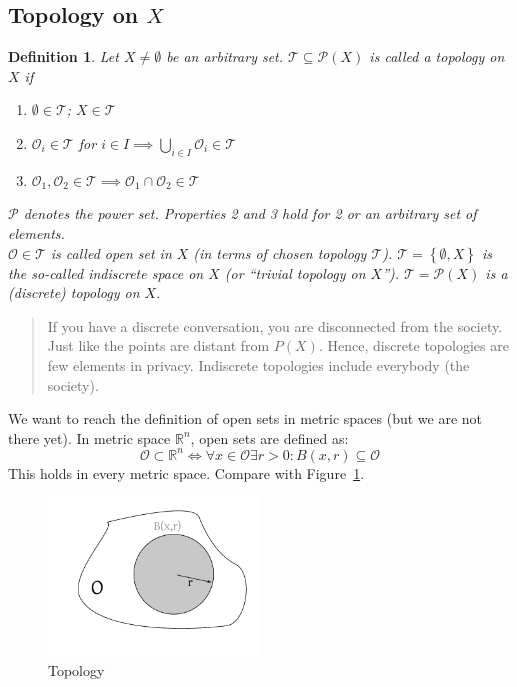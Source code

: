 \documentclass{article}
\newtheorem{definition}{Definition}  \numberwithin{definition}{section}
\newcommand{\set}[1]{\left\{#1\right\}}
\begin{document}
\subsection{Topology on $X$}

\begin{definition}
  Let $X \neq \emptyset$ be an arbitrary set.
  $\mathcal T \subseteq \mathcal P(X)$ is called a \emph{topology on $X$} if
  \begin{enumerate}
    \item $\emptyset \in \mathcal T$; $X \in \mathcal T$
    \item $\mathcal O_i \in \mathcal T$ for $i \in I \implies \bigcup_{i \in I} \mathcal O_i \in \mathcal T$
    \item $\mathcal O_1, \mathcal O_2 \in \mathcal T \implies \mathcal O_1 \cap \mathcal O_2 \in \mathcal T$
  \end{enumerate}
  $\mathcal P$ denotes the power set. Properties 2 and 3 hold for 2 or an arbitrary set of elements. \\
  $\mathcal O \in \mathcal T$ is called \emph{open set in $X$} (in terms of chosen topology $\mathcal T$).
  $\mathcal T = \set{\emptyset, X}$ is the so-called \emph{indiscrete space on $X$} (or \enquote{trivial topology on $X$}).
  $\mathcal T = \mathcal P(X)$ is a (discrete) topology on $X$.
\end{definition}

\begin{quote}
  If you have a discrete conversation, you are disconnected from the society.
  Just like the points are distant from $P(X)$.
  Hence, discrete topologies are few elements in privacy.
  Indiscrete topologies include everybody (the society).
\end{quote}

We want to reach the definition of open sets in metric spaces (but we are not there yet).
In metric space $\mathbb R^n$, open sets are defined as:
\[ \mathcal O \subset \mathbb R^n \Leftrightarrow \forall x \in \mathcal O \exists r > 0: B(x,r) \subseteq \mathcal O \]
This holds in every metric space. Compare with Figure~\ref{img:topology}.

\begin{figure}[!h]
  \begin{center}
    \includegraphics[width=0.5\textwidth]{img/01_topology.pdf}
    \caption{Topology}
    \label{img:topology}
  \end{center}
\end{figure}
\end{document}
